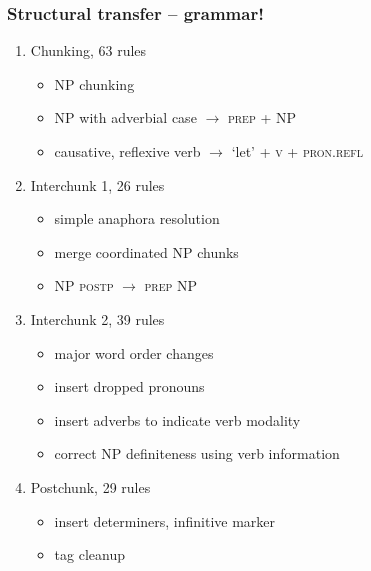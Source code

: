 \documentclass[notes=hide]{beamer}
\begin{document}
\begin{frame}\frametitle{Structural transfer -- grammar!}
\begin{enumerate}
\item Chunking, 63 rules
  \begin{itemize}
    \item NP chunking
    \item NP with adverbial case $\rightarrow$ \textsc{prep} + NP
    \item causative, reflexive verb $\rightarrow$ `let' + \textsc{v} + \textsc{pron.refl}
  \end{itemize}

\item Interchunk 1, 26 rules
  \begin{itemize}
  \item simple anaphora resolution
  \item merge coordinated NP chunks
  \item NP \textsc{postp} $\rightarrow$ \textsc{prep} NP
  \end{itemize}

\item Interchunk 2, 39 rules
  \begin{itemize}
  \item major word order changes
  \item insert dropped pronouns
  \item insert adverbs to indicate verb modality
  \item correct NP definiteness using verb information
  \end{itemize}

\item Postchunk, 29 rules
  \begin{itemize}
  \item insert determiners, infinitive marker
  \item tag cleanup
  \end{itemize}
\end{enumerate}
\end{frame}
\end{document}

